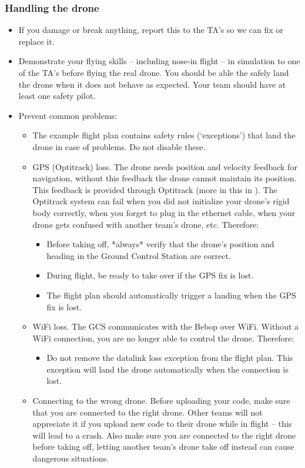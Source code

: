 \subsubsection*{Handling the drone}
\begin{itemize}
	\item If you damage or break anything, report this to the TA's so we can fix or replace it.
	\item Demonstrate your flying skills -- including nose-in flight -- in simulation to one of the TA's before flying the real drone. You should be able the safely land the drone when it does not behave as expected. Your team should have at least one safety pilot.
	\item Prevent common problems:
	\begin{itemize}
		\item The example flight plan contains safety rules (`exceptions') that land the drone in case of problems. Do not disable these.
		\item GPS (Optitrack) loss. The drone needs position and velocity feedback for navigation, without this feedback the drone cannot maintain its position. This feedback is provided through Optitrack (more in this in ). The Optitrack system can fail when you did not initialize your drone's rigid body correctly, when you forget to plug in the ethernet cable, when your drone gets confused with another team's drone, etc. Therefore:
		\begin{itemize}
			\item Before taking off, *always* verify that the drone's position and heading in the Ground Control Station are correct.
			\item During flight, be ready to take over if the GPS fix is lost.
			\item The flight plan should automatically trigger a landing when the GPS fix is lost.
		\end{itemize}
		\item WiFi loss. The GCS communicates with the Bebop over WiFi. Without a WiFi connection, you are no longer able to control the drone. Therefore:
		\begin{itemize}
			\item Do not remove the datalink loss exception from the flight plan. This exception will land the drone automatically when the connection is lost.
		\end{itemize}
		\item Connecting to the wrong drone. Before uploading your code, make sure that you are connected to the right drone. Other teams will not appreciate it if you upload new code to their drone while in flight -- this will lead to a crash. Also make sure you are connected to the right drone before taking off, letting another team's drone take off instead can cause dangerous situations.

\end{itemize}
\end{itemize}
